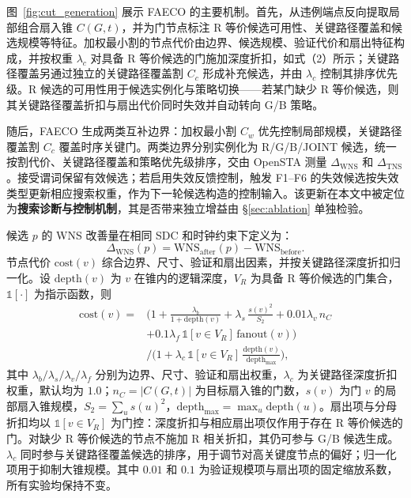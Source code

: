 \documentclass[twocolumn,10pt,fontset=windows]{ctexart}
\begin{document}
图~\ref{fig:cut_generation} 展示 FAECO 的主要机制。首先，从违例端点反向提取局部组合扇入锥 $C(G,t)$，并为门节点标注 R 等价候选可用性、关键路径覆盖和候选规模等特征。加权最小割的节点代价由边界、候选规模、验证代价和扇出特征构成，并按权重 $\lambda_c$ 对具备 R 等价候选的门施加深度折扣，如式（2）所示；关键路径覆盖另通过独立的关键路径覆盖割 $C_c$ 形成补充候选，并由 $\lambda_c$ 控制其排序优先级。R 候选的可用性用于候选实例化与策略切换——若某门缺少 R 等价候选，则其关键路径覆盖折扣与扇出代价同时失效并自动转向 G/B 策略。

随后，FAECO 生成两类互补边界：加权最小割 $C_w$ 优先控制局部规模，关键路径覆盖割 $C_c$ 覆盖时序关键门。两类边界分别实例化为 R/G/B/JOINT 候选，统一按割代价、关键路径覆盖和策略优先级排序，交由 OpenSTA 测量 $\Delta_{\mathrm{WNS}}$ 和 $\Delta_{\mathrm{TNS}}$。接受谓词保留有效候选；若启用失效反馈控制，触发 F1--F6 的失效候选按失效类型更新相应搜索权重，作为下一轮候选构造的控制输入。该更新在本文中被定位为\textbf{搜索诊断与控制机制}，其是否带来独立增益由 \S\ref{sec:ablation} 单独检验。

候选 $p$ 的 WNS 改善量在相同 SDC 和时钟约束下定义为：
\begin{equation}\label{eq:dtiming}
\Delta_{\mathrm{WNS}}(p) = \mathrm{WNS}_{\mathrm{after}}(p) - \mathrm{WNS}_{\mathrm{before}}.
\end{equation}
节点代价 $\mathrm{cost}(v)$ 综合边界、尺寸、验证和扇出因素，并按关键路径深度折扣归一化。设 $\mathrm{depth}(v)$ 为 $v$ 在锥内的逻辑深度，$V_R$ 为具备 R 等价候选的门集合，$\mathbb{1}[\cdot]$ 为指示函数，则
{\small
\begin{equation}
\label{eq:cost}
\begin{aligned}
\mathrm{cost}(v) ={}& \Big(1 + \frac{\lambda_b}{1+\mathrm{depth}(v)}
 + \lambda_s\,\frac{s(v)^2}{S_2}
 + 0.01\lambda_v\,n_C \\
 &+ 0.1\lambda_f\,\mathbb{1}[v{\in}V_R]\,\mathrm{fanout}(v)\Big) \\
 &\Big/\Big(1 + \lambda_c\,\mathbb{1}[v{\in}V_R]\,
 \frac{\mathrm{depth}(v)}{\mathrm{depth}_{\max}}\Big),
\end{aligned}
\end{equation}
}
其中 $\lambda_b/\lambda_s/\lambda_v/\lambda_f$ 分别为边界、尺寸、验证和扇出权重，$\lambda_c$ 为关键路径深度折扣权重，默认均为 $1.0$；$n_C=|C(G,t)|$ 为目标扇入锥的门数，$s(v)$ 为门 $v$ 的局部扇入锥规模，$S_2=\sum_u s(u)^2$，$\mathrm{depth}_{\max}=\max_u \mathrm{depth}(u)$。扇出项与分母折扣均以 $\mathbb{1}[v{\in}V_R]$ 为门控：深度折扣与相应扇出项仅作用于存在 R 等价候选的门。对缺少 R 等价候选的节点不施加 R 相关折扣，其仍可参与 G/B 候选生成。$\lambda_c$ 同时参与关键路径覆盖候选的排序，用于调节对高关键度节点的偏好；归一化项用于抑制大锥规模。其中 $0.01$ 和 $0.1$ 为验证规模项与扇出项的固定缩放系数，所有实验均保持不变。
\end{document}
